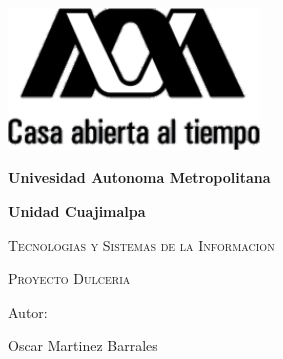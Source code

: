 \documentclass{report}
\begin{document}
    \begin{titlepage}
        \centering
        {\includegraphics[width=0.5\textwidth]{imagenes/logo.png}\par}
        \vspace{1cm}
        {\bfseries\LARGE Univesidad Autonoma Metropolitana\par}
        \vspace{1cm}
        {\bfseries\large Unidad Cuajimalpa\par}  
        \vspace{1cm}
        {\scshape\Large Tecnologias y Sistemas de la Informacion \par}
        \vspace{2cm}
        {\scshape\Huge Proyecto Dulceria \par}
        \vspace{2cm}
        {\Large Autor: \par}
        {\Large Oscar Martinez Barrales \par}
        \vfill 
    \end{titlepage}

\newpage

\newpage

\end{document}
